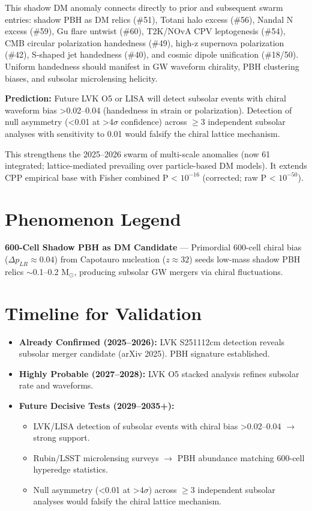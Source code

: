 \documentclass[11pt]{article}
\begin{document}
This shadow DM anomaly connects directly to prior and subsequent swarm entries: shadow PBH as DM relics (\#51), Totani halo excess (\#56), Nandal N excess (\#59), Gu flare untwist (\#60), T2K/NOvA CPV leptogenesis (\#54), CMB circular polarization handedness (\#49), high-z supernova polarization (\#42), S-shaped jet handedness (\#40), and cosmic dipole unification (\#18/50). Uniform handedness should manifest in GW waveform chirality, PBH clustering biases, and subsolar microlensing helicity.

\textbf{Prediction:} Future LVK O5 or LISA will detect subsolar events with chiral waveform bias >0.02--0.04 (handedness in strain or polarization). Detection of null asymmetry (<0.01 at >4$\sigma$ confidence) across $\geq 3$ independent subsolar analyses with sensitivity to 0.01 would falsify the chiral lattice mechanism.

This strengthens the 2025--2026 swarm of multi-scale anomalies (now 61 integrated; lattice-mediated prevailing over particle-based DM models). It extends CPP empirical base with Fisher combined P < $10^{-16}$ (corrected; raw P < $10^{-50}$).

\section{Phenomenon Legend}
\textbf{600-Cell Shadow PBH as DM Candidate} — Primordial 600-cell chiral bias ($\Delta p_{LR} \approx 0.04$) from Capotauro nucleation ($z \approx 32$) seeds low-mass shadow PBH relics $\sim$0.1--0.2 M$_\odot$, producing subsolar GW mergers via chiral fluctuations.

\section{Timeline for Validation}
\begin{itemize}
    \item \textbf{Already Confirmed (2025--2026):} LVK S251112cm detection reveals subsolar merger candidate (arXiv 2025). PBH signature established.
    \item \textbf{Highly Probable (2027--2028):} LVK O5 stacked analysis refines subsolar rate and waveforms.
    \item \textbf{Future Decisive Tests (2029--2035+):}
    \begin{itemize}
        \item LVK/LISA detection of subsolar events with chiral bias >0.02--0.04 $\to$ strong support.
        \item Rubin/LSST microlensing surveys $\to$ PBH abundance matching 600-cell hyperedge statistics.
        \item Null asymmetry (<0.01 at >4$\sigma$) across $\geq 3$ independent subsolar analyses would falsify the chiral lattice mechanism.
    \end{itemize}
\end{itemize}
\end{document}
